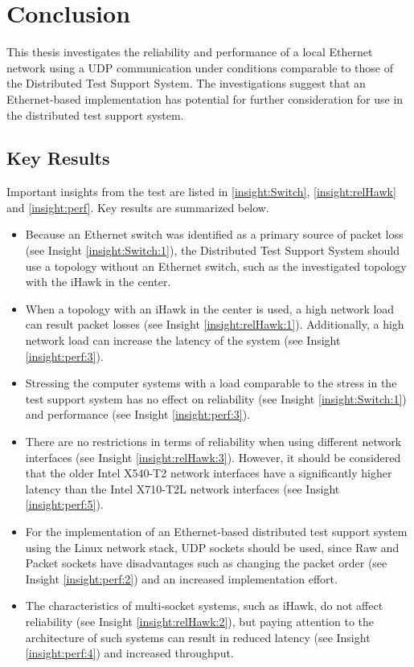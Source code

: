 \chapter{Conclusion} \label{chap:Conclusion}
This thesis investigates the reliability and performance of a local Ethernet network using a UDP communication under conditions comparable to those of the Distributed Test Support System. The investigations suggest that an Ethernet-based implementation has potential for further consideration for use in the distributed test support system.

\section{Key Results} \label{chap:KeyResults}
Important insights from the test are listed in \ref{insight:Switch}, \ref{insight:relHawk} and \ref{insight:perf}. Key results are summarized below.

\begin{itemize}
	\item Because an Ethernet switch was identified as a primary source of packet loss (see Insight \ref{insight:Switch:1}), the Distributed Test Support System should use a topology without an Ethernet switch, such as the investigated topology with the iHawk in the center.
	\item When a topology with an iHawk in the center is used, a high network load can result packet losses (see Insight \ref{insight:relHawk:1}). Additionally, a high network load can increase the latency of the system (see Insight \ref{insight:perf:3}).
	\item Stressing the computer systems with a load comparable to the stress in the test support system has no effect on reliability (see Insight \ref{insight:Switch:1}) and performance (see Insight \ref{insight:perf:3}).
	\item There are no restrictions in terms of reliability when using different network interfaces (see Insight \ref{insight:relHawk:3}). However, it should be considered that the older Intel X540-T2 network interfaces have a significantly higher latency than the Intel X710-T2L network interfaces (see Insight \ref{insight:perf:5}).
	\item For the implementation of an Ethernet-based distributed test support system using the Linux network stack, UDP sockets should be used, since Raw and Packet sockets have disadvantages such as changing the packet order (see Insight \ref{insight:perf:2}) and an increased implementation effort.
	\item The characteristics of multi-socket systems, such as iHawk, do not affect reliability (see Insight \ref{insight:relHawk:2}), but paying attention to the architecture of such systems can result in reduced latency (see Insight \ref{insight:perf:4}) and increased throughput.
\end{itemize}


